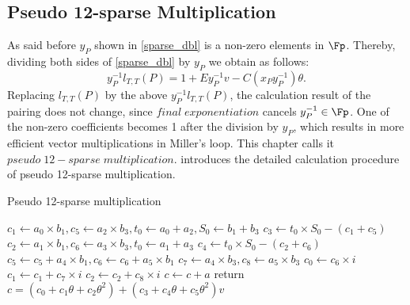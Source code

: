 \subsection{Pseudo 12-sparse Multiplication}
As said before $y_P$ shown in \eqref{sparse_dbl} is a non-zero elements in $\Fp$. Thereby, dividing both sides of \eqref{sparse_dbl} by $y_P$ we obtain as follows:
\begin{equation}\label{line_2}
	y_P^{-1}l_{T,T}(P)=1+Ey_P^{-1}v-C(x_Py_P^{-1})\theta.
\end{equation}
Replacing $l_{T,T}(P)$ by the above $y_P^{-1}l_{T,T}(P)$, the calculation result of the pairing does not change, since  $final\;exponentiation$ cancels $y_P^{-1}\in \Fp$. One of the non-zero coefficients becomes 1 after the division by $y_P$, which results in more efficient vector multiplications in Miller's loop. This chapter calls it $pseudo\;12-sparse\;multiplication$.   introduces the detailed calculation procedure of pseudo 12-sparse multiplication.
\begin{algorithm}[htbp]
	\caption{Pseudo 12-sparse multiplication}
	\label{algokss18sparsemul}
	\DontPrintSemicolon

	 $c_1\leftarrow a_0\times b_1,c_5\leftarrow a_2\times b_3,t_0\leftarrow a_0+a_2,S_0\leftarrow b_1+b_3$\;
	 $c_3\leftarrow t_0\times S_0-(c_1+c_5)$\;
	 $c_2\leftarrow a_1\times b_1,c_6\leftarrow a_3\times b_3,t_0\leftarrow a_1+a_3$\;
	 $c_4\leftarrow t_0\times S_0-(c_2+c_6)$\;
	 $c_5\leftarrow c_5+a_4\times b_1,c_6\leftarrow c_6+a_5\times b_1$\;
	 $c_7\leftarrow a_4\times b_3,c_8\leftarrow a_5\times b_3$\;
	 $c_0\leftarrow c_6\times i$\;
	 $c_1\leftarrow c_1+c_7\times i$\;
	 $c_2\leftarrow c_2+c_8\times i$\;
	 $c\leftarrow c+a$\;
	 return $c=(c_0+c_1\theta+c_2\theta^2)+(c_3+c_4\theta+c_5\theta^2)v$
\end{algorithm}
\vspace{-0.6em}

